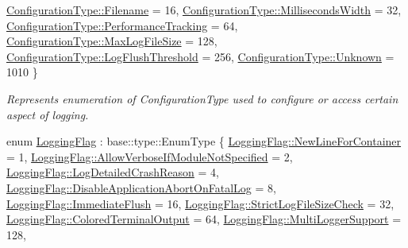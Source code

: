\begin{DoxyCompactItemize}
\newline
\hyperlink{namespaceel_a281f5db6d6163678bc68a8b23b59e124a1351017ac6423911223bc19a8cb7c653}{Configuration\+Type\+::\+Filename} = 16, 
\hyperlink{namespaceel_a281f5db6d6163678bc68a8b23b59e124a052bf0f0c813b3c41c5b5046ebc26529}{Configuration\+Type\+::\+Milliseconds\+Width} = 32, 
\hyperlink{namespaceel_a281f5db6d6163678bc68a8b23b59e124abe9e43d200c5698cb8519daed7035874}{Configuration\+Type\+::\+Performance\+Tracking} = 64, 
\hyperlink{namespaceel_a281f5db6d6163678bc68a8b23b59e124a4b35e615142d60db6383426f051e700b}{Configuration\+Type\+::\+Max\+Log\+File\+Size} = 128, 
\newline
\hyperlink{namespaceel_a281f5db6d6163678bc68a8b23b59e124ac1b4aae5c168e64292c9aa87a124ae86}{Configuration\+Type\+::\+Log\+Flush\+Threshold} = 256, 
\hyperlink{namespaceel_a281f5db6d6163678bc68a8b23b59e124a88183b946cc5f0e8c96b2e66e1c74a7e}{Configuration\+Type\+::\+Unknown} = 1010
 \}\begin{DoxyCompactList}\small\item\em Represents enumeration of Configuration\+Type used to configure or access certain aspect of logging. \end{DoxyCompactList}
\item 
enum \hyperlink{namespaceel_a2784aacd04cb7816ac1c0b20fcbf83cb}{Logging\+Flag} \+: base\+::type\+::\+Enum\+Type \{ \newline
\hyperlink{namespaceel_a2784aacd04cb7816ac1c0b20fcbf83cba8246f93d9afd63f87632d2d718cabca8}{Logging\+Flag\+::\+New\+Line\+For\+Container} = 1, 
\hyperlink{namespaceel_a2784aacd04cb7816ac1c0b20fcbf83cbac80d746c4296fe8e99ed032f5ffef31e}{Logging\+Flag\+::\+Allow\+Verbose\+If\+Module\+Not\+Specified} = 2, 
\hyperlink{namespaceel_a2784aacd04cb7816ac1c0b20fcbf83cba81ac37ef3ee37a01bf853be6abeb4ede}{Logging\+Flag\+::\+Log\+Detailed\+Crash\+Reason} = 4, 
\hyperlink{namespaceel_a2784aacd04cb7816ac1c0b20fcbf83cba8dd9782f8a19cf7a41e4ec38d1c6a4ae}{Logging\+Flag\+::\+Disable\+Application\+Abort\+On\+Fatal\+Log} = 8, 
\newline
\hyperlink{namespaceel_a2784aacd04cb7816ac1c0b20fcbf83cba7817e369fa619155822043e76ef88c7c}{Logging\+Flag\+::\+Immediate\+Flush} = 16, 
\hyperlink{namespaceel_a2784aacd04cb7816ac1c0b20fcbf83cba8496303f20ab09751ff3ec8802b187f5}{Logging\+Flag\+::\+Strict\+Log\+File\+Size\+Check} = 32, 
\hyperlink{namespaceel_a2784aacd04cb7816ac1c0b20fcbf83cbaeececaef2fc38e4f3c91f9f6b6fb6d49}{Logging\+Flag\+::\+Colored\+Terminal\+Output} = 64, 
\hyperlink{namespaceel_a2784aacd04cb7816ac1c0b20fcbf83cbaa2ce18adf399149a1b75bdafa773617e}{Logging\+Flag\+::\+Multi\+Logger\+Support} = 128, 

\end{DoxyCompactItemize}
